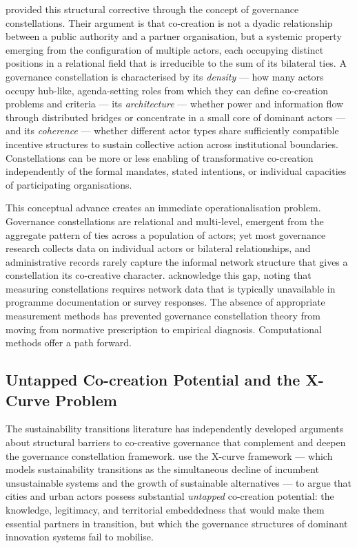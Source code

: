 \documentclass[review,12pt]{elsarticle}
\begin{document}
\citet{ansell2021co} provided this structural corrective through the concept of governance constellations. Their argument is that co-creation is not a dyadic relationship between a public authority and a partner organisation, but a systemic property emerging from the configuration of multiple actors, each occupying distinct positions in a relational field that is irreducible to the sum of its bilateral ties. A governance constellation is characterised by its \emph{density} --- how many actors occupy hub-like, agenda-setting roles from which they can define co-creation problems and criteria --- its \emph{architecture} --- whether power and information flow through distributed bridges or concentrate in a small core of dominant actors --- and its \emph{coherence} --- whether different actor types share sufficiently compatible incentive structures to sustain collective action across institutional boundaries. Constellations can be more or less enabling of transformative co-creation independently of the formal mandates, stated intentions, or individual capacities of participating organisations.

This conceptual advance creates an immediate operationalisation problem. Governance constellations are relational and multi-level, emergent from the aggregate pattern of ties across a population of actors; yet most governance research collects data on individual actors or bilateral relationships, and administrative records rarely capture the informal network structure that gives a constellation its co-creative character. \citet{torfing2019co} acknowledge this gap, noting that measuring constellations requires network data that is typically unavailable in programme documentation or survey responses. The absence of appropriate measurement methods has prevented governance constellation theory from moving from normative prescription to empirical diagnosis. Computational methods offer a path forward.

\subsection{Untapped Co-creation Potential and the X-Curve Problem}

The sustainability transitions literature has independently developed arguments about structural barriers to co-creative governance that complement and deepen the governance constellation framework. \citet{hebinck2023untapped} use the X-curve framework --- which models sustainability transitions as the simultaneous decline of incumbent unsustainable systems and the growth of sustainable alternatives --- to argue that cities and urban actors possess substantial \emph{untapped} co-creation potential: the knowledge, legitimacy, and territorial embeddedness that would make them essential partners in transition, but which the governance structures of dominant innovation systems fail to mobilise.
\end{document}
